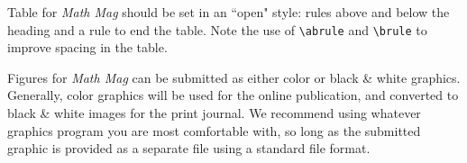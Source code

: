 \documentclass{book}
\theoremstyle{theorem}
\theoremstyle{definition}
\begin{document}
    Table for  \textit{Math Mag} should be set in an ``open" style: rules above and below the heading and a rule to end the table.  Note the use of \verb~\abrule~ and \verb~\brule~ to improve spacing in the table.



    Figures for  \textit{Math Mag} can be submitted as either color or black \& white graphics.  Generally, color graphics will be used for the online publication, and converted to black \& white images for the print journal.  We recommend using whatever graphics program you are most comfortable with, so long as the submitted graphic is provided as a separate file using a standard file format.
\end{document}
